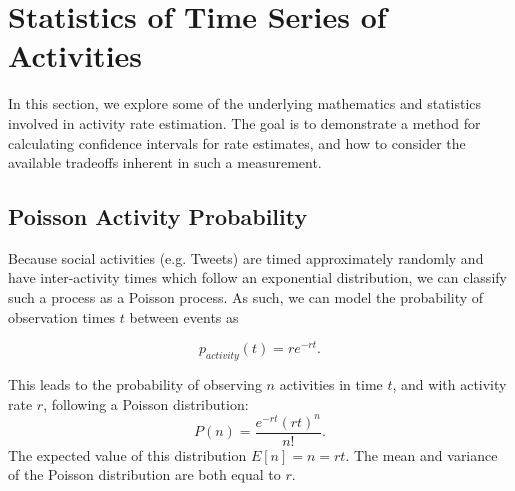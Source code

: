 \documentclass{article}
\begin{document}
\section{Statistics of Time Series of Activities} 
\label{time}

In this section, we explore some of the underlying mathematics and statistics involved in 
activity rate estimation. The goal is to demonstrate a method for calculating confidence 
intervals for rate estimates, and how to consider the available tradeoffs inherent in such 
a measurement.


\subsection{Poisson Activity Probability} 
\label{poisson}

Because 
\reversemarginpar\marginpar{\raggedleft
%
    \begin{tikzpicture}[scale=0.26]]
\draw [red, very thick, rotate around={60: (0, 0)}] (-0.7, -0.7) rectangle(0.7, 0.7);
%
\draw [very thick, <->] (0.25000000000000006, 0.4330127018922193) -- (1.25, 2.165063509461097) ;
\draw [very thick, <->] (1.75, 2.165063509461097) -- (2.75, 0.4330127018922193) ;
\draw [very thick, <->] (2.5, 0) -- (0.5, 0) ;
%
\draw [orange, ultra thick] (0,0) circle [radius= 0.5 ];
\draw [yellow, ultra thick] ( 1.5 , 2.59807621135 ) circle [radius= 0.5 ];
\draw [green,  ultra thick] ( 3.0 , 0 ) circle [radius= 0.5 ];
    \end{tikzpicture}
%
%
}
social activities (e.g. Tweets) are timed approximately randomly and have inter-activity 
times which follow an exponential distribution, we can classify such a process as a Poisson 
process. As such, we can model the probability of observation times $t$ between events as 

\begin{equation}
    \label{eq:tbe}
    p_{activity}(t) = r e^{-r t}.
\end{equation}

This leads to the probability of observing $n$ activities in time $t$, and with activity rate $r$, 
following a Poisson distribution:
\begin{equation}
    \label{eq:poisson}
    P(n) = \frac{e^{-r t} (r t)^n}{n!}.
\end{equation}
The expected value of this distribution $E[n]=n=rt$. The mean and variance of the Poisson distribution are 
both equal to $r$\cite{Devore:1999}.
\end{document}
